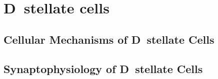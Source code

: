 \section{D~stellate cells}




\citep{SmithMassieEtAl:2005}



\subsection{Cellular Mechanisms of D~stellate Cells}


\subsection{Synaptophysiology of D~stellate Cells}


